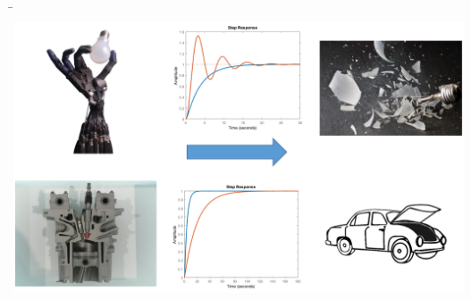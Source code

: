 \b{%
\begin{frame}
	\includegraphics[width=\textwidth]{Bilder/Ausgleichsvorgaenge_Beispiele_ET3_S_Exknowski_FH_SWF.png}%
\end{frame}
}

